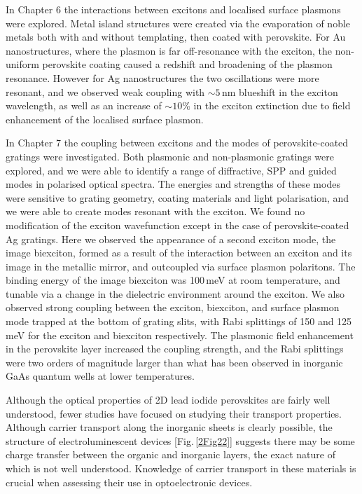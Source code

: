 In Chapter 6 the interactions between excitons and localised surface plasmons were explored. Metal island structures were created via the evaporation of noble metals both with and without templating, then coated with perovskite. For Au nanostructures, where the plasmon is far off-resonance with the exciton, the non-uniform perovskite coating caused a redshift and broadening of the plasmon resonance. However for Ag nanostructures the two oscillations were more resonant, and we observed weak coupling with $\sim 5$\,nm blueshift in the exciton wavelength, as well as an increase of $\sim 10$\% in the exciton extinction due to field enhancement of the localised surface plasmon.

In Chapter 7 the coupling between excitons and the modes of perovskite-coated gratings were investigated. Both plasmonic and non-plasmonic gratings were explored, and we were able to identify a range of diffractive, SPP and guided modes in polarised optical spectra. The energies and strengths of these modes were sensitive to grating geometry, coating materials and light polarisation, and we were able to create modes resonant with the exciton. We found no modification of the exciton wavefunction except in the case of perovskite-coated Ag gratings. Here we observed the appearance of a second exciton mode, the image biexciton, formed as a result of the interaction between an exciton and its image in the metallic mirror, and outcoupled via surface plasmon polaritons. The binding energy of the image biexciton was 100\,meV at room temperature, and tunable via a change in the dielectric environment around the exciton. We also observed strong coupling between the exciton, biexciton, and surface plasmon mode trapped at the bottom of grating slits, with Rabi splittings of 150 and 125\,meV for the exciton and biexciton respectively. The plasmonic field enhancement in the perovskite layer increased the coupling strength, and the Rabi splittings were two orders of magnitude larger than what has been observed in inorganic GaAs quantum wells at lower temperatures.

Although the optical properties of 2D lead iodide perovskites are fairly well understood, fewer studies have focused on studying their transport properties. Although carrier transport along the inorganic sheets is clearly possible, the structure of electroluminescent devices [Fig.\,\ref{2Fig22}] suggests there may be some charge transfer between the organic and inorganic layers, the exact nature of which is not well understood. Knowledge of carrier transport in these materials is crucial when assessing their use in optoelectronic devices.

